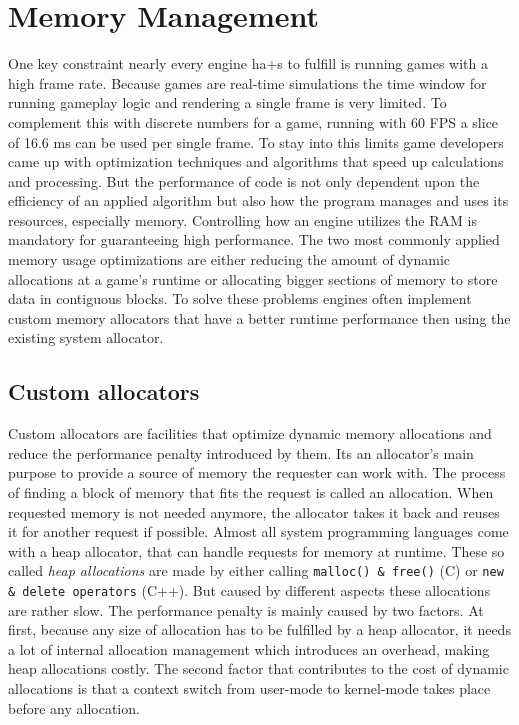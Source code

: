 \section{Memory Management} \label{mem_theory}

One key constraint nearly every engine ha+s to fulfill is running games with a high frame rate. Because games are real-time simulations the time window for running gameplay logic and rendering a single frame is very limited. To complement this with discrete numbers for a game, running with 60 \ac{FPS} a slice of 16.6 ms can be used per single frame. To stay into this limits game developers came up with optimization techniques and algorithms that speed up calculations and processing. But the performance of code is not only dependent upon the efficiency of an applied algorithm but also how the program manages and uses its resources, especially memory. Controlling how an engine utilizes the \ac{RAM} is mandatory for guaranteeing high performance. The two most commonly applied memory usage optimizations are either reducing the amount of dynamic allocations at a game's runtime or allocating bigger sections of memory to store data in contiguous blocks. To solve these problems engines often implement custom memory allocators that have a better runtime performance then using the existing system allocator.

\subsection{Custom allocators}

Custom allocators are facilities that optimize dynamic memory allocations and reduce the performance penalty introduced by them. Its an allocator's main purpose to provide a source of memory the requester can work with. The process of finding a block of memory that fits the request is called an allocation. When requested memory is not needed anymore, the allocator takes it back and reuses it for another request if possible.
Almost all system programming languages come with a heap allocator, that can handle requests for memory at runtime. These so called \textit{heap allocations} are made by either calling \texttt{malloc() \& free()} (C) or \texttt{new \& delete operators} (C++). But caused by different aspects these allocations are rather slow. The performance penalty is mainly caused by two factors. At first, because any size of allocation has to be fulfilled by a heap allocator, it needs a lot of internal allocation management which introduces an overhead, making heap allocations costly. The second factor that contributes to the cost of dynamic allocations is that a context switch from user-mode to kernel-mode takes place before any allocation. 

